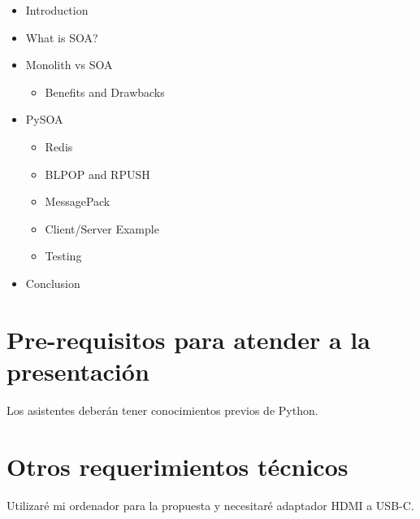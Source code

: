 \documentclass[runningheads]{llncs}
\begin{document}
\begin{itemize}
  \item Introduction
  \item What is SOA? \cite{IanGorton}
  \item Monolith vs SOA \cite{MartinFowler}
  \begin{itemize}
    \item Benefits and Drawbacks
  \end{itemize}
  \item PySOA \cite{PySOA}
  \begin{itemize}
    \item Redis
    \item BLPOP and RPUSH
    \item MessagePack
    \item Client/Server Example \cite{PySOAExample}
    \item Testing
  \end{itemize}
  \item Conclusion
\end{itemize}



\section{Pre-requisitos para atender a la presentación}
Los asistentes deber\'an tener conocimientos previos de Python.

\section{Otros requerimientos t\'ecnicos}

Utilizar\'e mi ordenador para la propuesta y necesitar\'e adaptador HDMI a USB-C.


\clearpage



\end{document}
